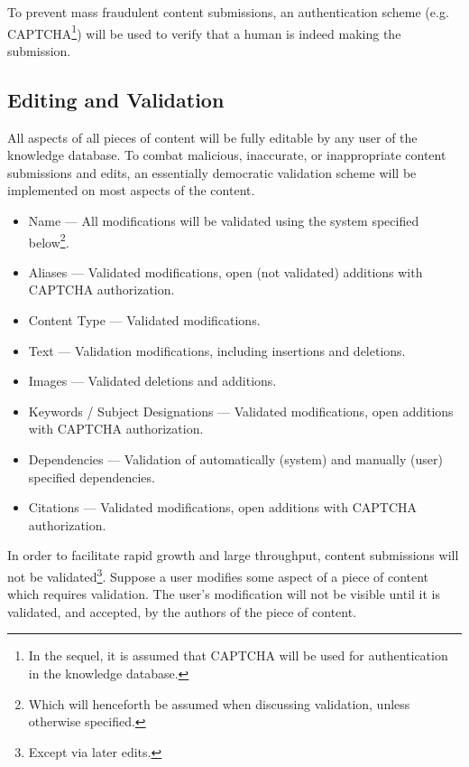 \documentclass[12pt,letterpaper]{article}
\begin{document}
To prevent mass fraudulent content submissions, an authentication scheme (e.g. CAPTCHA\footnote{In the sequel, it is assumed that CAPTCHA will be used for authentication in the knowledge database.}) will be used to verify that a human is indeed making the submission.  



\subsection{Editing and Validation}

All aspects of all pieces of content will be fully editable by any user of the knowledge database. To combat malicious, inaccurate, or inappropriate content submissions and edits, an essentially democratic validation scheme will be implemented on most aspects of the content. 

\begin{itemize}
\item Name --- All modifications will be validated using the system specified below\footnote{Which will henceforth be assumed when discussing validation, unless otherwise specified.}.
\item Aliases --- Validated modifications, open (not validated) additions with CAPTCHA authorization.
\item Content Type --- Validated modifications. 
\item Text --- Validation modifications, including insertions and deletions.
\item Images --- Validated deletions and additions. 
\item Keywords / Subject Designations --- Validated modifications, open additions with CAPTCHA authorization.
\item Dependencies --- Validation of automatically (system) and manually (user) specified dependencies. 
\item Citations --- Validated modifications, open additions with CAPTCHA authorization.
\end{itemize}

In order to facilitate rapid growth and large throughput, content submissions will not be validated\footnote{Except via later edits.}. Suppose a user modifies some aspect of a piece of content which requires validation. The user's modification will not be visible until it is validated, and accepted, by the authors of the piece of content. 
\end{document}
